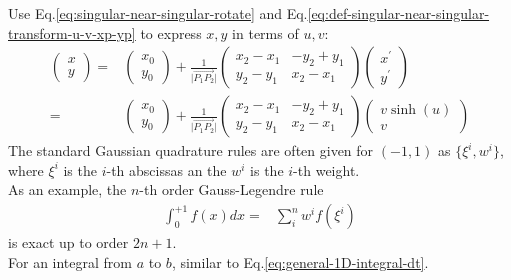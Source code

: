 \documentclass [10pt,letterpaper]{article}
\begin{document}
Use Eq.\eqref{eq:singular-near-singular-rotate} 
and Eq.\eqref{eq:def-singular-near-singular-transform-u-v-xp-yp} 
to express $x,y$ in terms of $u,v$:
\begin{equation} \label{eq:singular-near-singular-x-y-u-v}
	\begin{split} 
		\begin{pmatrix}
			x					\\
			y
		\end{pmatrix}
		=&
		\begin{pmatrix}
			x_0					\\
			y_0
		\end{pmatrix}
		+
		\frac{1}{\lvert \overrightarrow{P_1 P_2} \rvert}
		\begin{pmatrix} 
			x_2-x_1 	& 	-y_2+y_1	\\
			y_2-y_1 	& 	x_2-x_1		
		\end{pmatrix}
		\begin{pmatrix}
			x^{\prime}				\\
			y^{\prime}					
		\end{pmatrix}
		\\
		=& 
		\begin{pmatrix}
			x_0					\\
			y_0
		\end{pmatrix}
		+
		\frac{1}{\lvert \overrightarrow{P_1 P_2} \rvert}
		\begin{pmatrix} 
			x_2-x_1 	& 	-y_2+y_1	\\
			y_2-y_1 	& 	x_2-x_1		
		\end{pmatrix}
		\begin{pmatrix}
			v \sinh(u)				\\
			v
		\end{pmatrix}
	\end{split}
\end{equation}
The standard Gaussian quadrature rules are often given for $(-1,1)$ as $\{\xi^i,w^i\}$,
where $\xi^i$ is the $i$-th abscissas an the $w^i$ is the $i$-th weight.
\\
As an example, the $n$-th order Gauss-Legendre rule 
\begin{equation} \label{eq:singular-near-singular-gauss-legendre-rule-example}
	\begin{split} 
		\int \nolimits_{0}^{+1}
		f(x)
		dx
		=&
		\sum \limits_{i}^{n}
		w^i
		f(\xi^i)
	\end{split}
\end{equation}
is exact up to order $2n+1$.
\\
For an integral from $a$ to $b$, similar to Eq.\eqref{eq:general-1D-integral-dt}.
\end{document}
